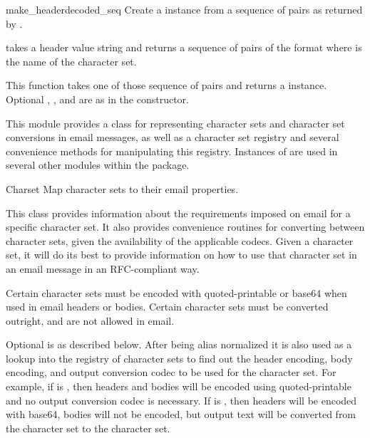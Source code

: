 \begin{funcdesc}{make_header}{decoded_seq}
Create a  instance from a sequence of pairs as returned
by .

 takes a header value string and returns a
sequence of pairs of the format  where
 is the name of the character set.

This function takes one of those sequence of pairs and returns a
 instance.  Optional ,
, and  are as in the
 constructor.
\end{funcdesc}


This module provides a class  for representing
character sets and character set conversions in email messages, as
well as a character set registry and several convenience methods for
manipulating this registry.  Instances of  are used in
several other modules within the  package.


\begin{classdesc}{Charset}{}
Map character sets to their email properties.

This class provides information about the requirements imposed on
email for a specific character set.  It also provides convenience
routines for converting between character sets, given the availability
of the applicable codecs.  Given a character set, it will do its best
to provide information on how to use that character set in an email
message in an RFC-compliant way.

Certain character sets must be encoded with quoted-printable or base64
when used in email headers or bodies.  Certain character sets must be
converted outright, and are not allowed in email.

Optional  is as described below.  After being alias
normalized it is also used as a lookup into the registry of character
sets to find out the header encoding, body encoding, and output
conversion codec to be used for the character set.  For example, if
 is , then headers and bodies will
be encoded using quoted-printable and no output conversion codec is
necessary.  If  is , then headers will
be encoded with base64, bodies will not be encoded, but output text
will be converted from the  character set to the
 character set.
\end{classdesc}

